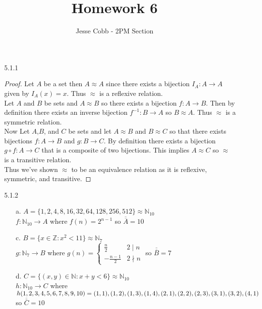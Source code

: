 \documentclass[11pt]{amsart}
\theoremstyle{definition}
\begin{document}
\title{Homework 6}

\author{Jesse Cobb - 2PM Section}

\maketitle

\begin{itemize}

\item[5.1.1] \begin{proof}
	Let $A$ be a set then $A\approx A$ since there exists a bijection $I_A:A\to A$ given by $I_A(x)=x$. Thus $\approx$ is a reflexive relation. \\
	Let $A$ and $B$ be sets and $A\approx B$ so there exists a bijection $f:A\to B$. Then by definition there exists an inverse bijection $f^{-1}:B\to A$ so $B\approx A$. Thus $\approx$ is a symmetric relation. \\
	Now Let $A$,$B$, and $C$ be sets and let $A\approx B$ and $B\approx C$ so that there exists bijections $f:A\to B$ and $g:B\to C$. By definition there exists a bijection $g\circ f:A\to C$ that is a composite of two bijections. This implies $A\approx C$ so $\approx$ is a transitive relation. \\
	Thus we've shown $\approx$ to be an equivalence relation as it is reflexive, symmetric, and transitive.
\end{proof}

\item[5.1.2]
\begin{itemize}
	\item[a.] $A=\{1,2,4,8,16,32,64,128,256,512\}\approx\mathbb{N}_{10}$\\
		$f:\mathbb{N}_{10}\to A$ where $f(n)=2^{n-1}$ so $\overline{\overline A}=10$

	\item[c.] $B=\{x\in\mathbb{Z}:x^2<11\}\approx\mathbb{N}_7$ \\
		$g:\mathbb{N}_7\to B$ where $g(n)=\begin{cases}
			\frac n2 & 2\mid n\\
			-\frac{n-1}2 & 2\nmid n
		\end{cases}$ so $\overline{\overline B}=7$

	\item[d.] $C=\{(x,y)\in\mathbb{N}:x+y<6\}\approx\mathbb{N}_{10}$\\
		$h:\mathbb{N}_{10}\to C$ where $h(1,2,3,4,5,6,7,8,9,10)\\=(1,1),(1,2),(1,3),(1,4),(2,1),(2,2),(2,3),(3,1),(3,2),(4,1)$ so $\overline{\overline C}=10$
\end{itemize}


\end{itemize}
\end{document}
